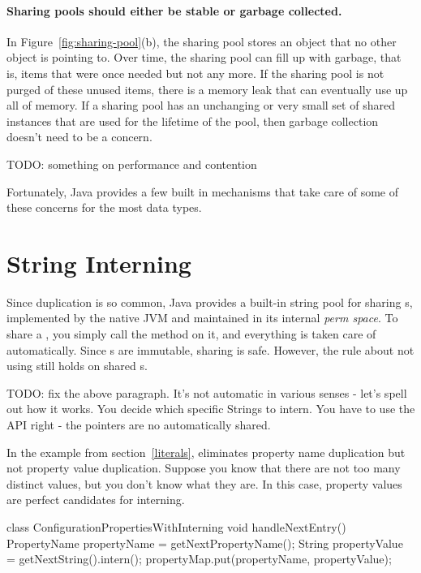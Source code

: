 \paragraph{Sharing pools should either be stable or garbage
collected.} In Figure~\ref{fig:sharing-pool}(b), the sharing pool stores an object
that no other object is pointing to. Over time, the sharing pool can fill up
with garbage, that is, items that were once needed but not any more. If the
sharing pool is not purged of these unused items, there is a memory
leak that can eventually use up all of memory. 
If a sharing pool has an unchanging or very small set of shared
instances that are used for the lifetime of the pool, then
garbage collection doesn't need to be a concern. 

TODO: something on performance and contention

Fortunately, Java provides a few built in mechanisms that take care of some of
these concerns for the most data types.

\section{String Interning}
\label{sec:sharing-strings}


 Since  duplication is so common, Java provides a built-in string
 pool for sharing s, implemented by the native JVM and maintained in
 its internal \emph{perm space}. To share a , you simply call the
 method  on it, and everything is taken care of automatically.
Since s are immutable, sharing is safe. However, the rule about
not using \code{==} still holds on shared s.

TODO: fix the above paragraph.  It's not automatic in various senses - let's
spell out how it works.  You decide which specific Strings to intern.  You have
to use the API right - the pointers are no automatically shared.
  
In the example from section~\ref{literals},
 eliminates property
name duplication but not
property value duplication. Suppose you know that there are
not too many distinct values, but you don't know what they are. In this case,
property values are perfect candidates for interning.
\begin{shortlisting}
 
 class ConfigurationPropertiesWithInterning {
    void handleNextEntry() {
       PropertyName propertyName = getNextPropertyName(); 
       String propertyValue = getNextString().intern();
       propertyMap.put(propertyName, propertyValue);
    }
}
\end{shortlisting}

